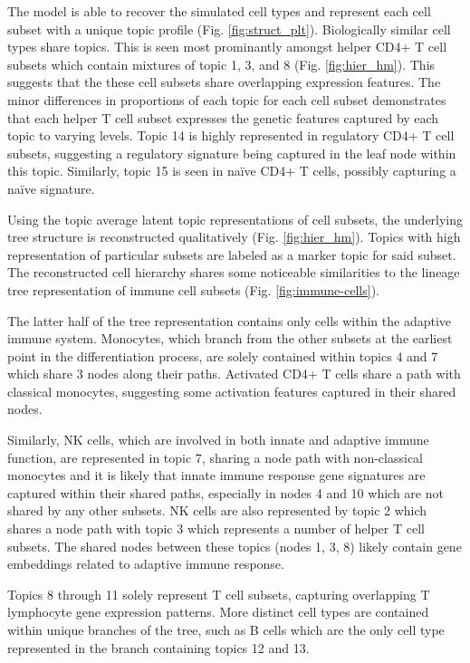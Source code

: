 The model is able to recover the simulated cell types and represent each cell subset with a unique topic profile (Fig. \ref{fig:struct_plt}). Biologically similar cell types share topics. This is seen most prominantly amongst helper CD4+ T cell subsets which contain mixtures of topic 1, 3, and 8 (Fig. \ref{fig:hier_hm}). This suggests that the these cell subsets share overlapping expression features. The minor differences in proportions of each topic for each cell subset demonstrates that each helper T cell subset expresses the genetic features captured by each topic to varying levels. Topic 14 is highly represented in regulatory CD4+ T cell subsets, suggesting a regulatory signature being captured in the leaf node within this topic. Similarly, topic 15 is seen in naïve CD4+ T cells, possibly capturing a naïve signature.

Using the topic average latent topic representations of cell subsets, the underlying tree structure is reconstructed qualitatively (Fig. \ref{fig:hier_hm}). Topics with high representation of particular subsets are labeled as a marker topic for said subset. The reconstructed cell hierarchy shares some noticeable similarities to the lineage tree representation of immune cell subsets (Fig. \ref{fig:immune-cells}). 

The latter half of the tree representation contains only cells within the adaptive immune system. Monocytes, which branch from the other subsets at the earliest point in the differentiation process, are solely contained within topics 4 and 7 which share 3 nodes along their paths. Activated CD4+ T cells share a path with classical monocytes, suggesting some activation features captured in their shared nodes. 

Similarly, NK cells, which are involved in both innate and adaptive immune function, are represented in topic 7, sharing a node path with non-classical monocytes and it is likely that innate immune response gene signatures are captured within their shared paths, especially in nodes 4 and 10 which are not shared by any other subsets. NK cells are also represented by topic 2 which shares a node path with topic 3 which represents a number of helper T cell subsets. The shared nodes between these topics (nodes 1, 3, 8) likely contain gene embeddings related to adaptive immune response.

Topics 8 through 11 solely represent T cell subsets, capturing overlapping T lymphocyte gene expression patterns. More distinct cell types are contained within unique branches of the tree, such as B cells which are the only cell type represented in the branch containing topics 12 and 13.

